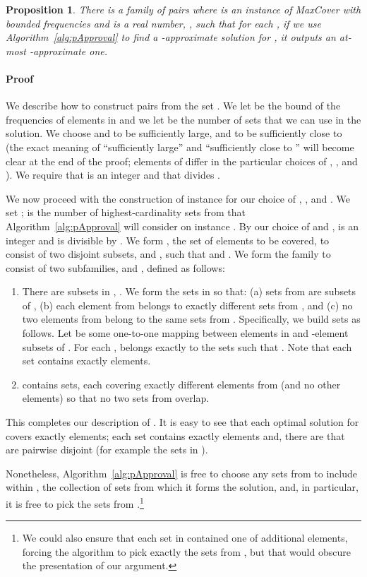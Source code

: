 \documentclass[11pt]{article}
\newtheorem{proposition}[theorem]{Proposition}
\newenvironment{proof}{\paragraph{Proof}}{\hfill\medskip}
\begin{document}
\begin{proposition}
  There is a family  of pairs  where  is an
  instance of MaxCover with bounded frequencies and  is a real
  number, , such that for each ,
  if we use Algorithm~\ref{alg:pApproval} to find a
  -approximate solution for , it outputs an at-most
  -approximate one.
\end{proposition}
\begin{proof}
  We describe how to construct pairs  from the set
  . We let  be the bound of the frequencies of elements in
   and we let  be the number of sets that we can use in the solution. We choose
   and  to be sufficiently large, and  to be sufficiently
  close to  (the exact meaning of ``sufficiently large'' and
  ``sufficiently close to '' will become clear at the end of the
  proof; elements of  differ in the particular choices of ,
  , and ).  We require that  is an
  integer and that  divides .

  We now proceed with the construction of instance 
  for our choice of , , and .  We set ;  is the number of highest-cardinality sets from
   that Algorithm~\ref{alg:pApproval} will consider on instance
  . By our choice of  and ,  is an integer and is
  divisible by .  We form , the set of elements to be covered,
  to consist of two disjoint subsets,  and , such that
   and .  We form the family  to consist of two
  subfamilies,  and , defined as follows:
  \begin{enumerate}
  \item There are  subsets in , . We form the sets in  so that: (a) sets from 
    are subsets of , (b) each element from  belongs to
    exactly  different sets from , and (c) no two elements
    from  belong to the same  sets from .
    Specifically, we build sets  as follows. Let
     be some one-to-one mapping between elements in  and
    -element subsets of . For each ,  belongs
    exactly to the sets  such that .  Note that each set 
    contains exactly 
    elements.

\item  contains  sets, each covering exactly  different elements from  (and no other
    elements) so that no two sets from  overlap.
\end{enumerate}
This completes our description of . It is easy to see that each
  optimal solution for  covers exactly 
  elements; each set contains exactly 
  elements and, there are  that are pairwise disjoint (for example
  the  sets in ).

  Nonetheless, Algorithm~\ref{alg:pApproval} is free to choose any 
  sets from  to include within , the collection of sets
  from which it forms the solution, and, in particular, it is free to
  pick the  sets from .\footnote{We could also ensure that
    each set in  contained one of  additional
    elements, forcing the algorithm to pick exactly the sets from
    , but that would obscure the presentation of our
    argument.} 


\end{proof}
\end{document}
